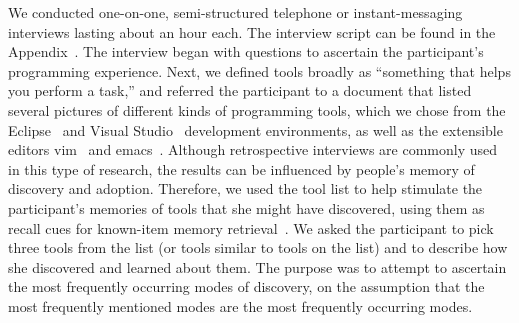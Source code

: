 \documentclass[smallextended]{svjour3}
\newcommand\contexts{modes\xspace}
\begin{document}
\noindent
We conducted one-on-one, semi-structured telephone or
instant-messaging interviews lasting about an hour each.
The interview script can be found in the Appendix~\cite{appendix}.
The interview began with questions to ascertain the
participant's programming experience.
Next, we defined tools broadly as 
``something that helps you perform a task,''
and referred the participant to a document that listed several pictures of 
different kinds of programming tools, which we chose from the Eclipse~\cite{eclipse} and
Visual Studio~\cite{visualstudio} development environments, 
as well as the extensible editors vim~\cite{vim}
and emacs~\cite{emacs}.
Although retrospective interviews are commonly used in this type of research,
the results can be influenced by people's memory of
discovery and adoption. 
Therefore, we used the tool list to help stimulate the participant's memories of
tools that she might have discovered, using them as recall cues for known-item 
memory retrieval~\cite{allen89}.
We asked the participant to pick three tools from the list (or tools
similar to tools on the list) and to describe how she discovered and learned
about them. 
The purpose was to attempt to ascertain the most frequently occurring \contexts
of discovery, on the assumption that the most frequently mentioned \contexts
are the most frequently occurring \contexts.
       
\end{document}
